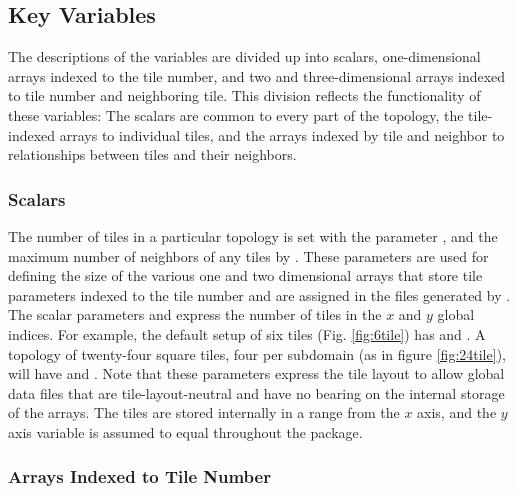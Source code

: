 \subsection{Key Variables}

The descriptions of the variables are divided up into scalars,
one-dimensional arrays indexed to the tile number, and two and
three-dimensional arrays indexed to tile number and neighboring tile.
This division reflects the functionality of these variables: The
scalars are common to every part of the topology, the tile-indexed
arrays to individual tiles, and the arrays indexed by tile and
neighbor to relationships between tiles and their neighbors. \\

\subsubsection{Scalars}

The number of tiles in a particular topology is set with the parameter
, and the maximum number of neighbors of any tiles by
.  These parameters are used for defining the
size of the various one and two dimensional arrays that store tile
parameters indexed to the tile number and are assigned in the files
generated by .\\

The scalar parameters 
and  express the number
of tiles in the $x$ and $y$ global indices.  For example, the default
setup of six tiles (Fig. \ref{fig:6tile}) has
 and .  A
topology of twenty-four square tiles, four per subdomain (as in figure
\ref{fig:24tile}), will have  and
.  Note that these parameters express the
tile layout to allow global data files that are tile-layout-neutral
and have no bearing on the internal storage of the arrays.  The tiles
are stored internally in a range from  the
$x$ axis, and the $y$ axis variable  is assumed to 
equal  throughout the package. \\

\subsubsection{Arrays Indexed to Tile Number}

